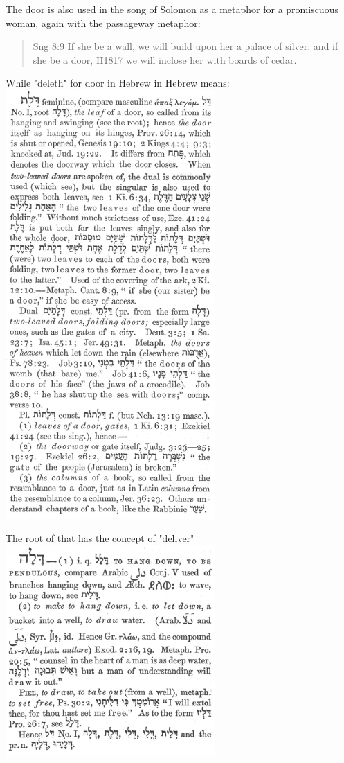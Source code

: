 \documentclass[11pt]{article}
\begin{document}
The door is also used in the song of Solomon as a metaphor for a promiscuous woman, again with the passageway metaphor:
\begin{quote}
Sng 8:9
If she be a wall, we will build upon her a palace of silver: and if she be a door, H1817 we will inclose her with boards of cedar.
\end{quote}
While "deleth" for door in Hebrew in Hebrew means:  \newline
\includegraphics[width=8cm]{deleth_h1817}

The root of that has the concept of "deliver" \newline
\includegraphics[width=8cm]{dala_h1802} \newline
\end{document}
